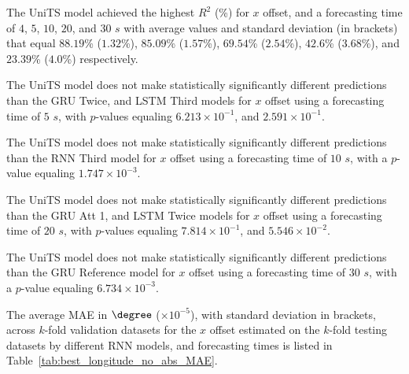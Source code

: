 The UniTS model achieved the highest $R^{2}$ (\%) for $x$ offset, and a forecasting time of $4$, $5$, $10$, $20$, and $30$ $s$ with average values and standard deviation (in brackets) that equal $88.19$\% ($1.32$\%), $85.09$\% ($1.57$\%), $69.54$\% ($2.54$\%), $42.6$\% ($3.68$\%), and $23.39$\% ($4.0$\%) respectively.

The UniTS model does not make statistically significantly different predictions than the GRU Twice, and LSTM Third models for $x$ offset using a forecasting time of $5$ $s$, with $p$-values equaling $6.213 \times 10^{-1}$, and $2.591 \times 10^{-1}$.


The UniTS model does not make statistically significantly different predictions than the RNN Third model for $x$ offset using a forecasting time of $10$ $s$, with a $p$-value equaling $1.747 \times 10^{-3}$.


The UniTS model does not make statistically significantly different predictions than the GRU Att 1, and LSTM Twice models for $x$ offset using a forecasting time of $20$ $s$, with $p$-values equaling $7.814 \times 10^{-1}$, and $5.546 \times 10^{-2}$.


The UniTS model does not make statistically significantly different predictions than the GRU Reference model for $x$ offset using a forecasting time of $30$ $s$, with a $p$-value equaling $6.734 \times 10^{-3}$.


The average MAE in $\degree$ ($\times 10^{-5}$), with standard deviation in brackets, across $k$-fold validation datasets for the $x$ offset estimated on the $k$-fold testing datasets by different RNN models, and forecasting times is listed in Table~\ref{tab:best_longitude_no_abs_MAE}.

